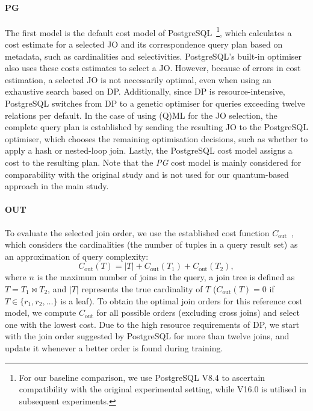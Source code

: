 \documentclass[10pt, conference]{IEEEtran}
\renewcommand{\Join}{\bowtie}
\begin{document}
\paragraph{PG}
The first model is the default cost model of PostgreSQL~\cite{postgres}\footnote{For our baseline comparison, we use PostgreSQL V8.4 to ascertain compatibility with the original experimental setting, while V16.0 is utilised in subsequent experiments.}, which calculates a cost estimate for a selected JO and its correspondence query plan based on metadata, such as cardinalities and selectivities.
PostgreSQL's built-in optimiser also uses these costs estimates to select a JO.
However, because of errors in cost estimation, a selected JO is not necessarily optimal, even when using an exhaustive search based on DP.
Additionally, since DP is resource-intensive, PostgreSQL switches from DP to a genetic optimiser for queries exceeding twelve relations per default.
In the case of using (Q)ML for the JO selection, the complete query plan is established by sending the resulting JO to the PostgreSQL optimiser, which chooses the remaining optimisation decisions, such as whether to apply a hash or nested-loop join.
Lastly, the PostgreSQL cost model assigns a cost to the resulting plan.
Note that the \emph{PG} cost model is mainly considered for comparability with the original study and is not used for our quantum-based approach in the main study.

\paragraph{OUT}
To evaluate the selected join order, we use the established cost function $C_{\text{out}}$~\cite{cluet95}, which considers the cardinalities (\ie the number of tuples in a query result set) as an approximation of query complexity:
%
\begin{equation}
  C_{\text{out}}(T) =
    |T| + C_{\text{out}}(T_1) + C_{\text{out}}(T_2),
\end{equation}
%
where $n$ is the maximum number of joins in the query, a join tree is defined as $T = T_1 \Join T_2$, and $|T|$ represents the true cardinality of $T$ ($C_{\text{out}}(T) = 0$ if $T \in \{r_1, r_2, \dots\}$ is a leaf).
To obtain the optimal join orders for this reference cost model, we compute $C_{\text{out}}$ for all possible orders (excluding cross joins) and select one with the lowest cost.
Due to the high resource requirements of DP, we
start with the join order suggested by PostgreSQL for more than 
twelve joins, and update it whenever a better order is
found during training.
\end{document}
